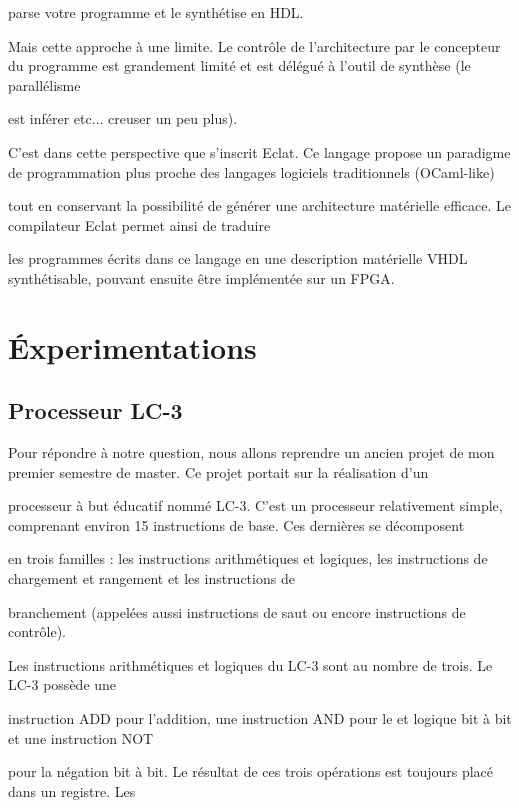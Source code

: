 \documentclass{article}
\begin{document}
parse votre programme et le synthétise en HDL. 

Mais cette approche à une limite. Le contrôle de l'architecture par le concepteur du programme est grandement limité et est délégué à l'outil de synthèse (le parallélisme

est inférer etc... creuser un peu plus). 

C'est dans cette perspective que s'inscrit Eclat. Ce langage propose un paradigme de programmation plus proche des langages logiciels traditionnels (OCaml-like) 

tout en conservant la possibilité de générer une architecture matérielle efficace. Le compilateur Eclat permet ainsi de traduire 

les programmes écrits dans ce langage en une description matérielle VHDL synthétisable, pouvant ensuite être implémentée sur un FPGA.


\newpage

\section{Éxperimentations}

\subsection{Processeur LC-3}

Pour répondre à notre question, nous allons reprendre un ancien projet de mon premier semestre de master. Ce projet portait sur la réalisation d'un 


processeur à but éducatif nommé LC-3. C'est un processeur relativement simple, comprenant environ 15 instructions de base. Ces dernières se décomposent 


en trois familles : les instructions arithmétiques et logiques, les instructions de chargement et rangement et les instructions de 

branchement (appelées aussi instructions de saut ou encore instructions de contrôle).

Les instructions arithmétiques et logiques du LC-3 sont au nombre de trois. Le LC-3 possède une

instruction ADD pour l’addition, une instruction AND pour le et logique bit à bit et une instruction NOT

pour la négation bit à bit. Le résultat de ces trois opérations est toujours placé dans un registre. Les
\end{document}
